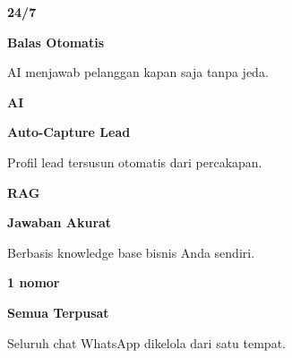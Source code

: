 \documentclass[a4paper]{article}
\begin{document}
\noindent
\begin{minipage}[t]{0.485\textwidth}
    \noindent\colorbox{BlueBg}{%
        \begin{minipage}[t][2.7cm][c]{\dimexpr\linewidth-2\fboxsep\relax}
            \centering
            {\fontsize{20}{24}\selectfont\bfseries\color{BluePrimary} 24/7}\par\vspace{2pt}
            {\fontsize{9.5}{12}\selectfont\bfseries\color{BlueDark} Balas Otomatis}\par\vspace{2pt}
            {\fontsize{8.5}{11}\selectfont\color{TextDark}AI menjawab pelanggan kapan saja tanpa jeda.}
        \end{minipage}}\par
    \vspace{6pt}
    \noindent\colorbox{BlueBg}{%
        \begin{minipage}[t][2.7cm][c]{\dimexpr\linewidth-2\fboxsep\relax}
            \centering
            {\fontsize{20}{24}\selectfont\bfseries\color{BluePrimary} AI}\par\vspace{2pt}
            {\fontsize{9.5}{12}\selectfont\bfseries\color{BlueDark} Auto-Capture Lead}\par\vspace{2pt}
            {\fontsize{8.5}{11}\selectfont\color{TextDark}Profil lead tersusun otomatis dari percakapan.}
        \end{minipage}}%
\end{minipage}%
\hfill
\begin{minipage}[t]{0.485\textwidth}
    \noindent\colorbox{BlueBg}{%
        \begin{minipage}[t][2.7cm][c]{\dimexpr\linewidth-2\fboxsep\relax}
            \centering
            {\fontsize{20}{24}\selectfont\bfseries\color{BluePrimary} RAG}\par\vspace{2pt}
            {\fontsize{9.5}{12}\selectfont\bfseries\color{BlueDark} Jawaban Akurat}\par\vspace{2pt}
            {\fontsize{8.5}{11}\selectfont\color{TextDark}Berbasis knowledge base bisnis Anda sendiri.}
        \end{minipage}}\par
    \vspace{6pt}
    \noindent\colorbox{BlueBg}{%
        \begin{minipage}[t][2.7cm][c]{\dimexpr\linewidth-2\fboxsep\relax}
            \centering
            {\fontsize{20}{24}\selectfont\bfseries\color{BluePrimary} 1 nomor}\par\vspace{2pt}
            {\fontsize{9.5}{12}\selectfont\bfseries\color{BlueDark} Semua Terpusat}\par\vspace{2pt}
            {\fontsize{8.5}{11}\selectfont\color{TextDark}Seluruh chat WhatsApp dikelola dari satu tempat.}
        \end{minipage}}%
\end{minipage}
\end{document}
